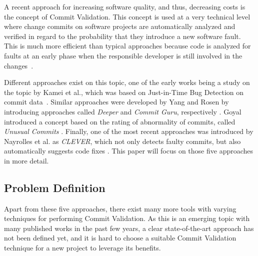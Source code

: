 A recent approach for increasing software quality, and thus, decreasing costs is the concept of Commit Validation. This concept is used at a very technical level where change commits on software projects are automatically analyzed and verified in regard to the probability that they introduce a new software fault. This is much more efficient than typical approaches because code is analyzed for faults at an early phase when the responsible developer is still involved in the changes~\cite{Kamei2013}.

Different approaches exist on this topic,
one of the early works being a study on the topic by Kamei et al., which was based on Just-in-Time Bug Detection on commit data~\cite{Kamei2013}. Similar approaches were developed by Yang and Rosen by introducing approaches called \textit{Deeper} and \textit{Commit Guru}, respectively \cite{Yang2015,Rosen2015}. Goyal introduced a concept based on the rating of abnormality of commits, called \textit{Unusual Commits} \cite{Goyal2017}. Finally, one of the most recent approaches was introduced by Nayrolles et al. as \textit{CLEVER}, which not only detects faulty commits, but also automatically suggests code fixes \cite{Nayrolles2018}. This paper will focus on those five approaches in more detail.

\subsection{Problem Definition}

Apart from these five approaches, there exist many more tools with varying techniques for performing Commit Validation.
As this is an emerging topic with many published works in the past few years, a clear state-of-the-art approach has not been defined yet, and it is hard to choose a suitable Commit Validation technique for a new project to leverage its benefits. 

